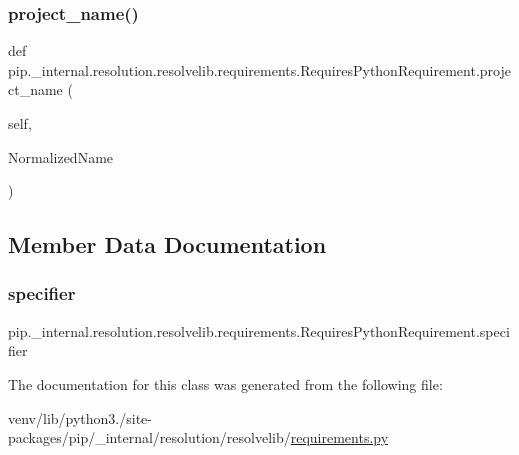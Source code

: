\subsubsection{\texorpdfstring{project\+\_\+name()}{project\_name()}}
{\footnotesize\ttfamily def pip.\+\_\+internal.\+resolution.\+resolvelib.\+requirements.\+Requires\+Python\+Requirement.\+project\+\_\+name (\begin{DoxyParamCaption}\item[{}]{self,  }\item[{}]{Normalized\+Name }\end{DoxyParamCaption})}



\subsection{Member Data Documentation}
\mbox{\label{classpip_1_1__internal_1_1resolution_1_1resolvelib_1_1requirements_1_1RequiresPythonRequirement_a1af711e1d5390e79fdc315d956f45bab}} 
\subsubsection{\texorpdfstring{specifier}{specifier}}
{\footnotesize\ttfamily pip.\+\_\+internal.\+resolution.\+resolvelib.\+requirements.\+Requires\+Python\+Requirement.\+specifier}



The documentation for this class was generated from the following file\+:\begin{DoxyCompactItemize}
\item 
venv/lib/python3./site-\/packages/pip/\+\_\+internal/resolution/resolvelib/\hyperlink{pip_2__internal_2resolution_2resolvelib_2requirements_8py}{requirements.\+py}\end{DoxyCompactItemize}
